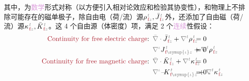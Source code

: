 其中，为\textcolor{Plum}{数学}形式对称（以方便引入相对论效应和检验其协变性\cite{lakhtakiaCovariancesInvariancesMaxwell1995,chen-zhuChenZhuxieUndergraduate_courses2024}），和\textcolor{NavyBlue}{物理}上不排除可能存在的磁单极子，除自由电（荷/流）源${\rho}^{\;\!\mathcolor{gray}{t}}_{\;\!\textcolor{Maroon}{\text{f}}\mathcolor{gray}{z}}, \bar{J}^{\;\!\mathcolor{gray}{t}}_{\;\!\textcolor{Maroon}{\text{f}}\mathcolor{gray}{z}}$外，还添加了自由磁（荷/流）源${\kappa}^{\;\!\mathcolor{gray}{t}}_{\;\!\textcolor{Maroon}{\text{f}}\mathcolor{gray}{z}}, \bar{K}^{\;\!\mathcolor{gray}{t}}_{\;\!\textcolor{Maroon}{\text{f}}\mathcolor{gray}{z}}$\cite{lakhtakiaCovariancesInvariancesMaxwell1995}。这 4 个自由源（体密度）项，满足 2 个\textcolor{Plum}{连续}性假设\cite{mackayElectromagneticAnisotropyBianisotropy2019,lakhtakiaCovariancesInvariancesMaxwell1995,chen-zhuChenZhuxieUndergraduate_courses2024}：
\begin{subequations} \label{eq:Div-em-f}
	\abovedisplayskip=-4pt
	\belowdisplayskip=10pt
\begin{align}
	\textcolor{Maroon}{\text{Continuity for free electric charge}}\text{:}&\hspace{0.5em} \mathcolor{gray}{\bar{\nabla} \cdot} \bar{J}^{\;\!\mathcolor{gray}{t}}_{\;\!\textcolor{Maroon}{\text{f}}\mathcolor{gray}{z}} + \mathcolor{gray}{\nabla^t} {\rho}^{\;\!\mathcolor{gray}{t}}_{\;\!\textcolor{Maroon}{\text{f}}\mathcolor{gray}{z}} \hspace{-5.3em} &&= 0 \label{eq:Div-e-f} \\ 
	&\hspace{0.5em} \mathcolor{gray}{\nabla^\iota} J^{\;\!\mathcolor{gray}{t}}_{\;\!\textcolor{Maroon}{\text{f}} \mathcolor{gray}{\symup{\iota}}\mathcolor{gray}{z}} + \mathcolor{gray}{\nabla^t} {\rho}^{\;\!\mathcolor{gray}{t}}_{\;\!\textcolor{Maroon}{\text{f}}\mathcolor{gray}{z}} \hspace{-5.3em} &&= 0~, \label{eq:div-e-f} \\ 
	\textcolor{Maroon}{\text{Continuity for free magnetic charge}}\text{:}&\hspace{0.5em} \mathcolor{gray}{\bar{\nabla} \cdot} \bar{K}^{\;\!\mathcolor{gray}{t}}_{\;\!\textcolor{Maroon}{\text{f}}\mathcolor{gray}{z}} + \mathcolor{gray}{\nabla^t} {\kappa}^{\;\!\mathcolor{gray}{t}}_{\;\!\textcolor{Maroon}{\text{f}}\mathcolor{gray}{z}} \hspace{-5.3em} &&= 0 \label{eq:Div-m-f} \\
	&\hspace{0.5em} \mathcolor{gray}{\nabla^\iota} \Xint{\mathcolor{gray}{-}}{10}{K}^{\;\!\mathcolor{gray}{t}}_{\;\!\textcolor{Maroon}{\text{f}} \mathcolor{gray}{\symup{\iota}}\mathcolor{gray}{z}} + \mathcolor{gray}{\nabla^t} {\kappa}^{\;\!\mathcolor{gray}{t}}_{\;\!\textcolor{Maroon}{\text{f}}\mathcolor{gray}{z}} \hspace{-5.3em} &&= 0~. \label{eq:div-m-f}
\end{align}
\end{subequations}
